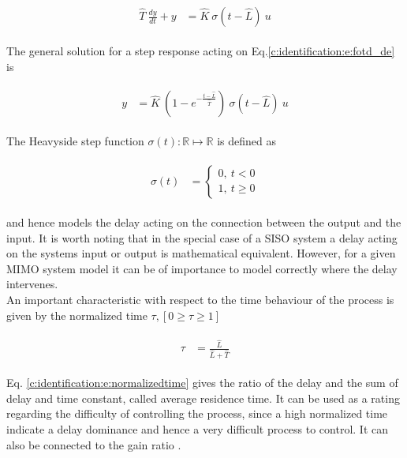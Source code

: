 \begin{align}
\begin{split}
\hat{T}~\frac{dy}{dt} + y &= \hat{K} ~\sigma(t-\hat{L})~u
\end{split}
\label{c:identification:e:fotd_de}
\end{align}

The general solution for a step response acting on Eq.\ref{c:identification:e:fotd_de} is 

\begin{align}
\begin{split}
y &= \hat{K} ~\left( 1 - e^{-\frac{t- \hat{L}}{\hat{T}}}\right)~ \sigma(t-\hat{L}) ~u
\end{split}
\label{c:identification:e:fodt_dt}
\end{align}

The Heavyside step function $\sigma(t): \mathbb{R} \mapsto \mathbb{R}$ is defined as

\begin{align}
\begin{split}
\sigma(t) &= \begin{cases} 
      0 , ~t < 0 \\
      1, ~t \geq 0
   \end{cases}
\end{split}
\label{c:identificitaion:e:heavyside}
\end{align}

and hence models the delay acting on the connection between the output and the input. It is worth noting that in the special case of a SISO system a delay acting on the systems input or output is mathematical equivalent. However, for a given MIMO system model it can be of importance to model correctly where the delay intervenes. \\

An important characteristic with respect to the time behaviour of the process is given by the normalized time $\tau, \left[0 \geq \tau \geq 1 \right] $ \cite[p.16]{Astrom1995}

\begin{align}
\begin{split}
\tau &= \frac{\hat{L}}{\hat{L}+\hat{T}}
\end{split}
\label{c:identification:e:normalizedtime}
\end{align}

Eq. \ref{c:identification:e:normalizedtime} gives the ratio of the delay and the sum of delay and time constant, called average residence time. It can be used as a rating regarding the difficulty of controlling the process, since a high normalized time indicate a delay dominance and hence a very difficult process to control. It can also be connected to the gain ratio \cite[p.27]{Astrom2006}.\\

